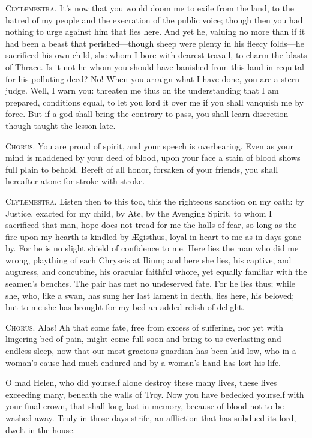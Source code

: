 \documentclass[12pt]{article}
\begin{document}
\textsc{Clyt{\ae}mestra.} It's now that you would doom me to exile from the land, to the hatred of my people and the execration of the public voice; though then you had nothing to urge against him that lies here. And yet he, valuing no more than if it had been a beast that perished---though sheep were plenty in his fleecy folds---he sacrificed his own child, she whom I bore with dearest travail, to charm the blasts of Thrace. Is it not he whom you should have banished from this land in requital for his polluting deed? No! When you arraign what I have done, you are a stern judge. Well, I warn you: threaten me thus on the understanding that I am prepared, conditions equal, to let you lord it over me if you shall vanquish me by force. But if a god shall bring the contrary to pass, you shall learn discretion though taught the lesson late.

\textsc{Chorus.} You are proud of spirit, and your speech is overbearing. Even as your mind is maddened by your deed of blood, upon your face a stain of blood shows full plain to behold. Bereft of all honor, forsaken of your friends, you shall hereafter atone for stroke with stroke.

\textsc{Clyt{\ae}mestra.} Listen then to this too, this the righteous sanction on my oath: by Justice, exacted for my child, by Ate, by the Avenging Spirit, to whom I sacrificed that man, hope does not tread for me the halls of fear, so long as the fire upon my hearth is kindled by {\AE}gisthus, loyal in heart to me as in days gone by. For he is no slight shield of confidence to me. Here lies the man who did me wrong, plaything of each Chryseis at Ilium; and here she lies, his captive, and auguress, and concubine, his oracular faithful whore, yet equally familiar with the seamen's benches. The pair has met no undeserved fate. For he lies thus; while she, who, like a swan, has sung her last lament in death, lies here, his beloved; but to me she has brought for my bed an added relish of delight.

\textsc{Chorus.} Alas! Ah that some fate, free from excess of suffering, nor yet with lingering bed of pain, might come full soon and bring to us everlasting and endless sleep, now that our most gracious guardian has been laid low, who in a woman's cause had much endured and by a woman's hand has lost his life.

O mad Helen, who did yourself alone destroy these many lives, these lives exceeding many, beneath the walls of Troy. Now you have bedecked yourself with your final crown, that shall long last in memory, because of blood not to be washed away. Truly in those days strife, an affliction that has subdued its lord, dwelt in the house.
\end{document}
